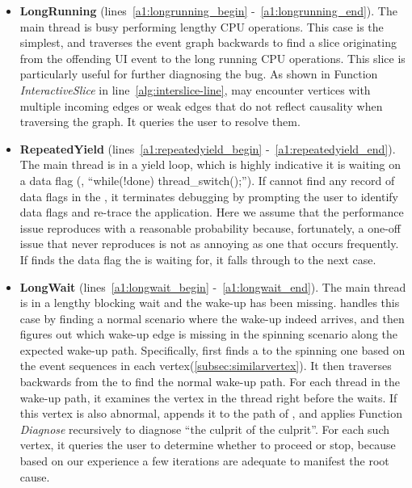 \begin{itemize}
	\item \textbf{LongRunning} (lines~\ref{a1:longrunning_begin}
		-~\ref{a1:longrunning_end}). The main thread is busy performing lengthy
		CPU operations. This case is the simplest, and \xxx traverses the event
		graph backwards to find a slice originating from the offending UI event
		to the long running CPU operations. This slice is particularly useful for
		further diagnosing the bug. As shown in Function \textit{InteractiveSlice} in
		line~\ref{alg:interslice-line}, \xxx may encounter vertices with multiple
		incoming edges or weak edges that do not reflect causality when traversing
		the graph. It queries the user to resolve them.

	\item \textbf{RepeatedYield} (lines~\ref{a1:repeatedyield_begin}
		-~\ref{a1:repeatedyield_end}). The main thread is in a yield loop, which
		is highly indicative it is waiting on a data flag (\eg, ``while(!done)
		thread\_switch();''). If \xxx cannot find any record of data flags in the
		\spinningnode, it terminates debugging by prompting the user to identify data
		flags and re-trace the application. Here we assume that the performance issue
		reproduces with a reasonable probability because, fortunately, a one-off issue
		that never reproduces is not as annoying as one that occurs frequently. If
		\xxx finds the data flag the \spinningnode is waiting for, it falls through to
		the next case.

	\item \textbf{LongWait} (lines~\ref{a1:longwait_begin}
		-~\ref{a1:longwait_end}). The main thread is in a lengthy blocking wait and
		the wake-up has been missing. \xxx handles this case by finding a normal
		scenario where the wake-up indeed arrives, and then figures out which wake-up
		edge is missing in the spinning scenario along the expected wake-up path.
		Specifically, \xxx first finds a \similarnode to the spinning one based
		on the event sequences in each vertex(\ref{subsec:similarvertex}). It then traverses
		backwards from the \similarnode to find the normal wake-up path. For each
		thread in the wake-up path, it examines the vertex in the thread right before
		the \spinningnode waits. If this vertex is also abnormal, \xxx appends it
		to the path of \rootcausenodes, and applies Function \textit{Diagnose} recursively
		to diagnose ``the culprit of the culprit''. For each such vertex, it queries the
		user to determine whether to proceed or stop, because based on our experience
		a few iterations are adequate to manifest the root cause.

\end{itemize}
